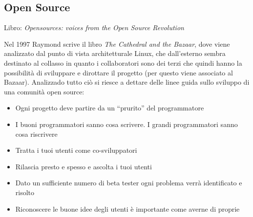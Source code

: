 \subsection{Open Source}

Libro: \textit{Opensources: voices from the Open Source Revolution}

Nel 1997 Raymond scrive il libro \textit{The Cathedral and the Bazaar}, dove viene analizzato dal punto di vista architetturale Linux, che dall'esterno sembra destinato al collasso in quanto i collaboratori sono dei terzi che quindi hanno la possibilit\`a di sviluppare e dirottare il progetto (per questo viene associato al Bazaar). Analizzado tutto ci\`o si riesce a dettare delle linee guida sullo sviluppo di una comunit\`a open source:
\begin{itemize}

\item Ogni progetto deve partire da un ``prurito'' del programmatore
\item I buoni programmatori sanno cosa scrivere. I grandi programmatori sanno cosa riscrivere
\item Tratta i tuoi utenti come co-sviluppatori
\item Rilascia presto e spesso e ascolta i tuoi utenti
\item Dato un sufficiente numero di beta tester ogni problema verr\`a identificato e risolto
\item Riconoscere le buone idee degli utenti \`e importante come averne di proprie

\end{itemize}

